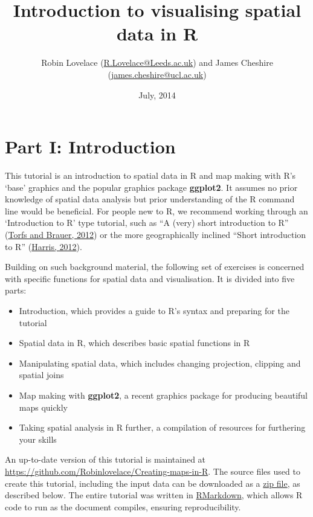 \documentclass[]{article}
\title{Introduction to visualising spatial data in R}
\author{Robin Lovelace
(\href{mailto:R.Lovelace@Leeds.ac.uk}{R.Lovelace@Leeds.ac.uk}) and James
Cheshire
(\href{mailto:james.cheshire@ucl.ac.uk}{james.cheshire@ucl.ac.uk})}
\date{July, 2014}
\begin{document}
\maketitle


{
\hypersetup{linkcolor=black}
\setcounter{tocdepth}{2}
\tableofcontents
}
\newpage

\section{Part I: Introduction}\label{part-i-introduction}

This tutorial is an introduction to spatial data in R and map making
with R's `base' graphics and the popular graphics package
\textbf{ggplot2}. It assumes no prior knowledge of spatial data analysis
but prior understanding of the R command line would be beneficial. For
people new to R, we recommend working through an `Introduction to R'
type tutorial, such as ``A (very) short introduction to R''
(\href{http://cran.r-project.org/doc/contrib/Torfs+Brauer-Short-R-Intro.pdf}{Torfs
and Brauer, 2012}) or the more geographically inclined ``Short
introduction to R''
(\href{http://www.social-statistics.org/wp-content/uploads/2012/12/intro_to_R1.pdf}{Harris,
2012}).

Building on such background material, the following set of exercises is
concerned with specific functions for spatial data and visualisation. It
is divided into five parts:

\begin{itemize}
\itemsep1pt\parskip0pt
\item
  Introduction, which provides a guide to R's syntax and preparing for
  the tutorial
\item
  Spatial data in R, which describes basic spatial functions in R
\item
  Manipulating spatial data, which includes changing projection,
  clipping and spatial joins
\item
  Map making with \textbf{ggplot2}, a recent graphics package for
  producing beautiful maps quickly
\item
  Taking spatial analysis in R further, a compilation of resources for
  furthering your skills
\end{itemize}

An up-to-date version of this tutorial is maintained at
\href{https://github.com/Robinlovelace/Creating-maps-in-R/blob/master/intro-spatial-rl.pdf}{\url{https://github.com/Robinlovelace/Creating-maps-in-R}}.
The source files used to create this tutorial, including the input data
can be downloaded as a
\href{https://github.com/Robinlovelace/Creating-maps-in-R/archive/master.zip}{zip
file}, as described below. The entire tutorial was written in
\href{http://rmarkdown.rstudio.com/}{RMarkdown}, which allows R code to
run as the document compiles, ensuring reproducibility.
\end{document}
